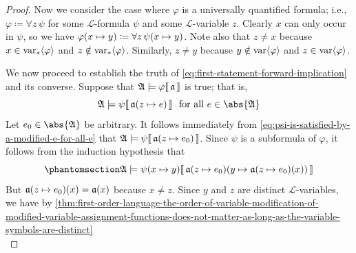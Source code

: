 \begin{proof}
    \vspace{0.3cm}
    \noindent
    Now we consider the case where \( \varphi \) is a universally quantified formula; i.e., \( \varphi \coloneq \forall z \, \psi \) for some \( \mathcal{L} \)-formula \( \psi \)
    and some \( \mathcal{L} \)-variable \( z \). Clearly \( x \) can only occur in \( \psi \), so we have
    \( \folfreevariablereplacement{\varphi}{x}{y} \coloneq \forall z \, \folfreevariablereplacement{\psi}{x}{y} \).
    Note also that \( z \neq x \) because \( x \in \operatorname{var}_{\ast} \langle\varphi\rangle \) and \( z \notin \operatorname{var}_{\ast} \langle\varphi\rangle \).
    Similarly, \( z \neq y \) because \( y \notin \operatorname{var} \langle\varphi\rangle \) and \( z \in \operatorname{var} \langle\varphi\rangle \).

    \vspace{0.3cm}
    \noindent
    We now proceed to establish the truth of \eqref{eq:first-statement-forward-implication} and its converse.
    Suppose that \(  \mathfrak{A} \models \varphi\llbracket\, \mathfrak{a} \,\rrbracket \) is true; that is,
    \begin{equation}
        \label{eq:psi-is-satisfied-by-a-modified-e-for-all-e}
        \folwffsatisfaction{\mathfrak{A}}{\psi}{ \folmodifiedvariableassignmentfunction{\mathfrak{a}}{z}{e} }
        \ \ \text{for all} \ e \in \abs{\mathfrak{A}}
    \end{equation}
    Let \( e_{0} \in \abs{\mathfrak{A}} \) be arbitrary. It follows immediately from \eqref{eq:psi-is-satisfied-by-a-modified-e-for-all-e} that
    \( \folwffsatisfaction{\mathfrak{A}}{\psi}{ \folmodifiedvariableassignmentfunction{\mathfrak{a}}{z}{e_{0}} } \).
    Since \( \psi \) is a subformula of \( \varphi \), it follows from the induction hypothesis that
    \begin{equation}
        \phantomsection \label{eq:psi-x-mapsto-y-is-satisfied-using-e0}
        \folwffsatisfaction{\mathfrak{A}}{\folfreevariablereplacement{\psi}{x}{y}}{ \folmodifiedvariableassignmentfunction{ \folmodifiedvariableassignmentfunction{\mathfrak{a}}{z}{e_{0}} }{y}{ \folmodifiedvariableassignmentfunction{\mathfrak{a}}{z}{e_{0}}(x) } }
    \end{equation}
    But \( \folmodifiedvariableassignmentfunction{\mathfrak{a}}{z}{e_{0}}(x) = \mathfrak{a}(x) \) because \( x \neq z \).
    Since \( y \) and \( z \) are distinct \( \mathcal{L} \)-variables, we have by
    \cref{thm:first-order-language-the-order-of-variable-modification-of-modified-variable-assignment-functions-does-not-matter-as-long-as-the-variable-symbols-are-distinct}
    \begin{equation}

\end{equation}
\end{proof}
